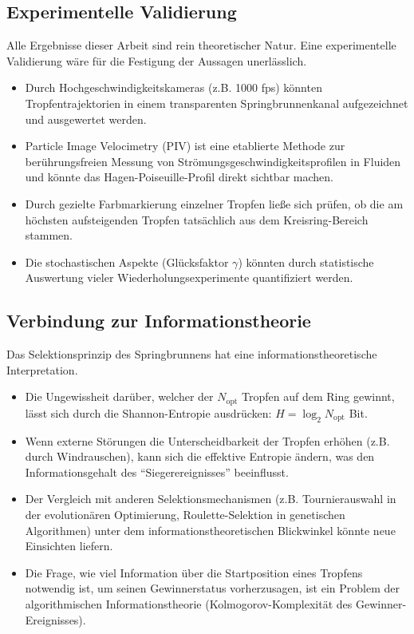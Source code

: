 ﻿\documentclass[a4paper,12pt]{article}
\theoremstyle{definition}
\begin{document}
\subsection{Experimentelle Validierung}

Alle Ergebnisse dieser Arbeit sind rein theoretischer Natur. Eine experimentelle
Validierung wäre für die Festigung der Aussagen unerlässlich.

\begin{itemize}
    \item Durch Hochgeschwindigkeitskameras (z.B. 1000 fps) könnten Tropfentrajektorien
          in einem transparenten Springbrunnenkanal aufgezeichnet und ausgewertet werden.
    \item Particle Image Velocimetry (PIV) ist eine etablierte Methode zur berührungs\-freien
          Messung von Strömungsgeschwindigkeitsprofilen in Fluiden und könnte das
          Hagen-Poiseuille-Profil direkt sichtbar machen.
    \item Durch gezielte Farbmarkierung einzelner Tropfen ließe sich prüfen, ob die
          am höchsten aufsteigenden Tropfen tatsächlich aus dem Kreisring-Bereich stammen.
    \item Die stochastischen Aspekte (Glücksfaktor $\gamma$) könnten durch statistische
          Auswertung vieler Wiederholungsexperimente quantifiziert werden.
\end{itemize}

\subsection{Verbindung zur Informationstheorie}

Das Selektionsprinzip des Springbrunnens hat eine informationstheoretische Interpretation.

\begin{itemize}
    \item Die Ungewissheit darüber, welcher der $N_{\text{opt}}$ Tropfen auf dem Ring
          gewinnt, lässt sich durch die Shannon-Entropie ausdrücken:
          $H = \log_2 N_{\text{opt}}$ Bit.
    \item Wenn externe Störungen die Unterscheidbarkeit der Tropfen erhöhen
          (z.B. durch Windrauschen), kann sich die effektive Entropie ändern, was den
          Informationsgehalt des ``Siegerereignisses'' beeinflusst.
    \item Der Vergleich mit anderen Selektionsmechanismen (z.B. Tournierauswahl in der
          evolutionären Optimierung, Roulette-Selektion in genetischen Algorithmen)
          unter dem informationstheoretischen Blickwinkel könnte neue Einsichten liefern.
    \item Die Frage, wie viel Information über die Startposition eines Tropfens notwendig
          ist, um seinen Gewinnerstatus vorherzusagen, ist ein Problem der algorithmischen
          Informationstheorie (Kolmogorov-Komplexität des Gewinner-Ereignisses).
\end{itemize}
\end{document}

